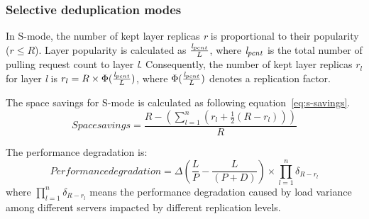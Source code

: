 \subsubsection{Selective deduplication modes}
In S-mode, the number of kept layer replicas \emph{r} is proportional to their popularity ($r \leq R$).
Layer popularity is calculated as $\frac{\emph{l}_{pcnt}}{L}$, 
where $\emph{l}_{pcnt}$ is the total number of pulling request count to layer \emph{l}.  
Consequently, the number of kept layer replicas $r_{l}$ for layer \emph{l} is
$r_{l} = R \times \Phi (\frac{\emph{l}_{pcnt}}{L})$, 
where $\Phi (\frac{\emph{l}_{pcnt}}{L})$ denotes a replication factor.

The space savings for S-mode is calculated as following equation~\ref{eq:s-savings}.
\begin{equation}\label{eq:s-savings}
Space savings = \frac{R-(\sum\limits_{l=1}^n(r_{l}+\frac{1}{2}(R-r_{l})))}{R} 
\end{equation}

The performance degradation is:
  \begin{equation}\label{eq:s-pull}
Performance degradation =  \Delta(\frac{L}{P} - \frac{L}{(P+D)})\times \prod\limits_{l=1}^n\delta_{R-r_{l}}
 \end{equation}
where $\prod\limits_{l=1}^n\delta_{R-r_{l}}$ means 
the performance degradation caused by load variance among different servers impacted by different replication levels.
 